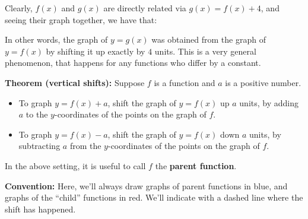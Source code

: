 \documentclass[handout, noauthor, nooutcomes]{ximera}
\begin{document}
 Clearly, $f(x)$ and $g(x)$ are directly related via $g(x) = f(x)+4$, and seeing their graph together, we have that:

   \begin{image}
 \end{image}

In other words, the graph of $y=g(x)$ was obtained from the graph of $y=f(x)$ by shifting it up exactly by $4$ units. This is a very general phenomenon, that happens for any functions who differ by a constant.

\begin{callout}
  {\bf Theorem (vertical shifts):} Suppose $f$ is a function and $a$ is a positive number.
  \begin{itemize}
  \item To graph $y = f(x)+a$, shift the graph of $y=f(x)$ up $a$ units, by adding $a$ to the $y$-coordinates of the points on the graph of $f$.
      \item To graph $y = f(x)-a$, shift the graph of $y=f(x)$ down $a$ units, by subtracting $a$ from the $y$-coordinates of the points on the graph of $f$.
  \end{itemize}
\end{callout}

In the above setting, it is useful to call $f$ the {\bf parent function}.

\begin{callout}
  {\bf Convention:} Here, we'll always draw graphs of parent functions in blue, and graphs of the ``child'' functions in red. We'll indicate with a dashed line where the shift has happened.
\end{callout}
\end{document}
